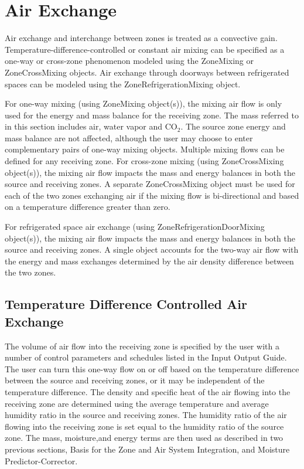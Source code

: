 \section{Air Exchange}\label{air-exchange}

Air exchange and interchange between zones is treated as a convective gain. Temperature-difference-controlled or constant air mixing can be specified as a one-way or cross-zone phenomenon modeled using the ZoneMixing or ZoneCrossMixing objects. Air exchange through doorways between refrigerated spaces can be modeled using the ZoneRefrigerationMixing object.

For one-way mixing (using ZoneMixing object(s)), the mixing air flow is only used for the energy and mass balance for the receiving zone. The mass referred to in this section includes air, water vapor and CO\(_{2}\). The source zone energy and mass balance are not affected, although the user may choose to enter complementary pairs of one-way mixing objects. Multiple mixing flows can be defined for any receiving zone. For cross-zone mixing (using ZoneCrossMixing object(s)), the mixing air flow impacts the mass and energy balances in both the source and receiving zones. A separate ZoneCrossMixing object must be used for each of the two zones exchanging air if the mixing flow is bi-directional and based on a temperature difference greater than zero.

For refrigerated space air exchange (using ZoneRefrigerationDoorMixing object(s)), the mixing air flow impacts the mass and energy balances in both the source and receiving zones. A single object accounts for the two-way air flow with the energy and mass exchanges determined by the air density difference between the two zones.

\subsection{Temperature Difference Controlled Air Exchange}\label{temperature-difference-controlled-air-exchange}

The volume of air flow into the receiving zone is specified by the user with a number of control parameters and schedules listed in the Input Output Guide. The user can turn this one-way flow on or off based on the temperature difference between the source and receiving zones, or it may be independent of the temperature difference. The density and specific heat of the air flowing into the receiving zone are determined using the average temperature and average humidity ratio in the source and receiving zones. The humidity ratio of the air flowing into the receiving zone is set equal to the humidity ratio of the source zone. The mass, moisture,and energy terms are then used as described in two previous sections, Basis for the Zone and Air System Integration, and Moisture Predictor-Corrector.

